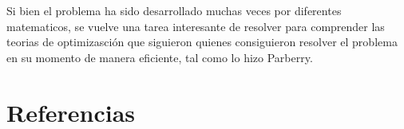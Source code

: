 \documentclass[journal, 10pt]{IEEEtran}
\begin{document}
Si bien el problema ha sido desarrollado muchas veces por diferentes matematicos, se vuelve una tarea interesante de resolver para comprender las teorias de optimizasci\'on que siguieron quienes consiguieron resolver el problema en su momento de manera eficiente, tal como lo hizo Parberry.








\section{Referencias}


\end{document}
